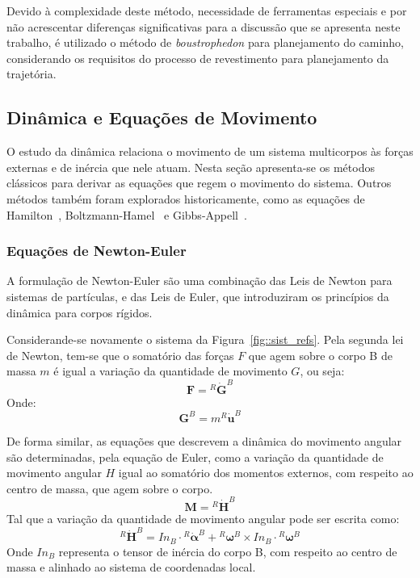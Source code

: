 Devido à complexidade deste método, necessidade de ferramentas especiais e por
não acrescentar diferenças significativas para a discussão que se apresenta
neste trabalho, é utilizado o método de \textit{boustrophedon} para planejamento
do caminho, considerando os requisitos do processo de revestimento para
planejamento da trajetória.



\subsection{Dinâmica e Equações de Movimento}

O estudo da dinâmica relaciona o movimento de um sistema multicorpos às forças
externas e de inércia que nele atuam. Nesta seção apresenta-se os métodos
clássicos para derivar as equações que regem o movimento do sistema. Outros
métodos também foram explorados historicamente, como as equações de
Hamilton~\cite{shabana2013dynamics},
Boltzmann-Hamel~\cite{papastavridis1994boltzmann} e
Gibbs-Appell~\cite{gibbsappell}.
 
\subsubsection{Equações de Newton-Euler}

A formulação de Newton-Euler são uma combinação das Leis de Newton para sistemas
de partículas, e das Leis de Euler, que introduziram os princípios da dinâmica
para corpos rígidos. 

Considerande-se novamente o sistema da Figura~\ref{fig::sist_refs}. Pela segunda
lei de Newton, tem-se que o somatório das forças $F$ que agem sobre o corpo B de
massa $m$ é igual a variação da quantidade de movimento $G$, ou seja:
%
\begin{equation} \label{eq::newton}
	\mathbf{F} = {^R}{\dot{\mathbf{G}}}^{B}
\end{equation}
%
Onde:
%
\begin{equation}
	\mathbf{G}^{B} = m {^R}\dot{\textbf{u}}^{B}
\end{equation}
%


De forma similar, as equações que descrevem a dinâmica do movimento angular são
determinadas, pela equação de Euler, como a variação da quantidade de movimento
angular $H$ igual ao somatório dos momentos externos, com respeito
ao centro de massa, que agem sobre o corpo.
%
\begin{equation} \label{eq::euler}
	\mathbf{M} = {^R}{\dot{\mathbf{H}}}^{B}
\end{equation}
%
Tal que a variação da quantidade de movimento angular pode ser escrita como:
%
\begin{equation}
	{^R}{\dot{\mathbf{H}}}^{B} = In_B \cdot {^R}\dot{\boldsymbol{\alpha}}^{B} +
	{^R}\boldsymbol{\omega}^{B} \times In_B \cdot {^R}\boldsymbol{\omega}^{B}
\end{equation}
%
Onde $In_B$ representa o tensor de inércia do corpo B, com respeito ao centro de
massa e alinhado ao sistema de coordenadas local.

